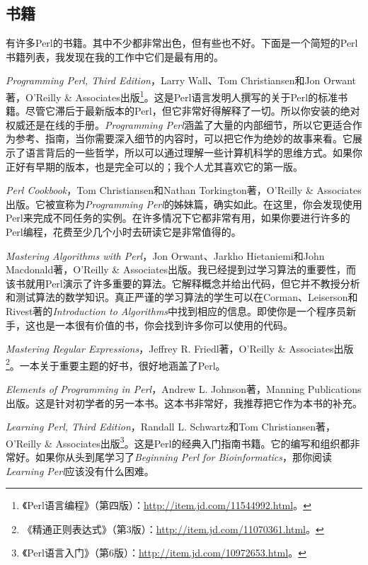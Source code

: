 \subsection{书籍}
有许多Perl的书籍。其中不少都非常出色，但有些也不好。下面是一个简短的Perl书籍列表，我发现在我的工作中它们是最有用的。

\textit{Programming Perl, Third Edition}，Larry Wall、Tom Christiansen和Jon Orwant著，O'Reilly \& Associates出版\footnote{《Perl语言编程》（第四版）：\href{http://item.jd.com/11544992.html}{http://item.jd.com/11544992.html}。}。这是Perl语言发明人撰写的关于Perl的标准书籍。尽管它滞后于最新版本的Perl，但它非常好得解释了一切。所以你安装的绝对权威还是在线的手册。\textit{Programming Perl}涵盖了大量的内部细节，所以它更适合作为参考、指南，当你需要深入细节的内容时，可以把它作为绝妙的故事来看。它展示了语言背后的一些哲学，所以可以通过理解一些计算机科学的思维方式。如果你正好有早期的版本，也是完全可以的；我个人尤其喜欢它的第一版。

\textit{Perl Cookbook}，Tom Christiansen和Nathan Torkington著，O'Reilly \& Associates出版。它被宣称为\textit{Programming Perl}的姊妹篇，确实如此。在这里，你会发现使用Perl来完成不同任务的实例。在许多情况下它都非常有用，如果你要进行许多的Perl编程，花费至少几个小时去研读它是非常值得的。

\textit{Mastering Algorithms with Perl}，Jon Orwant、Jarkho Hietaniemi和John Macdonald著，O'Reilly \& Associates出版。我已经提到过学习算法的重要性，而该书就用Perl演示了许多重要的算法。它解释概念并给出代码，但它并不教授分析和测试算法的数学知识。真正严谨的学习算法的学生可以在Corman、Leiserson和Rivest著的\textit{Introduction to Algorithms}中找到相应的信息。即使你是一个程序员新手，这也是一本很有价值的书，你会找到许多你可以使用的代码。

\textit{Mastering Regular Expressions}，Jeffrey R. Friedl著，O'Reilly \& Associates出版\footnote{《精通正则表达式》（第3版）：\href{http://item.jd.com/11070361.html}{http://item.jd.com/11070361.html}。}。一本关于重要主题的好书，很好地涵盖了Perl。 

\textit{Elements of Programming in Perl}，Andrew L. Johnson著，Manning Publications出版。这是针对初学者的另一本书。这本书非常好，我推荐把它作为本书的补充。

\textit{Learning Perl, Third Edition}，Randall L. Schwartz和Tom Christiansen著，O'Reilly \& Associates出版\footnote{《Perl语言入门》（第6版）：\href{http://item.jd.com/10972653.html}{http://item.jd.com/10972653.html}。}。这是Perl的经典入门指南书籍。它的编写和组织都非常好。如果你从头到尾学习了\textit{Beginning Perl for Bioinformatics}，那你阅读\textit{Learning Perl}应该没有什么困难。

